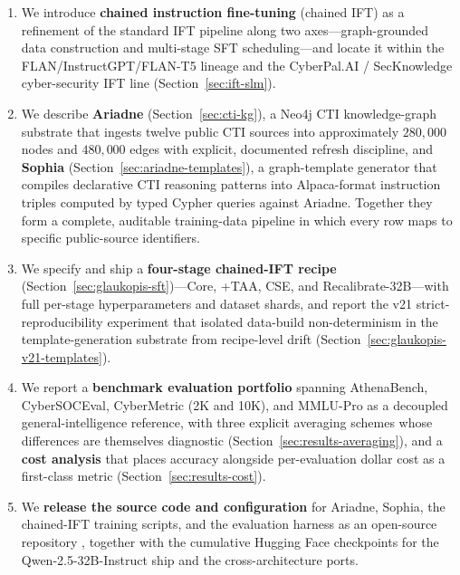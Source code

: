 \documentclass[webpdf,contemporary,large]{oup-authoring-template}
\theoremstyle{thmstyleone}
\theoremstyle{thmstyletwo}
\theoremstyle{thmstylethree}
\begin{document}
\begin{enumerate}
  \item We introduce \textbf{chained instruction fine-tuning} (chained IFT) as a refinement of the standard IFT pipeline along two axes---graph-grounded data construction and multi-stage SFT scheduling---and locate it within the FLAN/InstructGPT/FLAN-T5 lineage and the CyberPal.AI / SecKnowledge cyber-security IFT line (Section~\ref{sec:ift-slm}).

  \item We describe \textbf{Ariadne} (Section~\ref{sec:cti-kg}), a Neo4j CTI knowledge-graph substrate that ingests twelve public CTI sources into approximately $280{,}000$ nodes and $480{,}000$ edges with explicit, documented refresh discipline, and \textbf{Sophia} (Section~\ref{sec:ariadne-templates}), a graph-template generator that compiles declarative CTI reasoning patterns into Alpaca-format instruction triples computed by typed Cypher queries against Ariadne. Together they form a complete, auditable training-data pipeline in which every row maps to specific public-source identifiers.

  \item We specify and ship a \textbf{four-stage chained-IFT recipe} (Section~\ref{sec:glaukopis-sft})---Core, +TAA, CSE, and Recalibrate-32B---with full per-stage hyperparameters and dataset shards, and report the v21 strict-reproducibility experiment that isolated data-build non-determinism in the template-generation substrate from recipe-level drift (Section~\ref{sec:glaukopis-v21-templates}).

  \item We report a \textbf{benchmark evaluation portfolio} spanning AthenaBench, CyberSOCEval, CyberMetric (2K and 10K), and MMLU-Pro as a decoupled general-intelligence reference, with three explicit averaging schemes whose differences are themselves diagnostic (Section~\ref{sec:results-averaging}), and a \textbf{cost analysis} that places accuracy alongside per-evaluation dollar cost as a first-class metric (Section~\ref{sec:results-cost}).

  \item We \textbf{release the source code and configuration} for Ariadne, Sophia, the chained-IFT training scripts, and the evaluation harness as an open-source repository \cite{glaukopis2026repo}, together with the cumulative Hugging Face checkpoints for the Qwen-2.5-32B-Instruct ship and the cross-architecture ports.
\end{enumerate}
\end{document}
